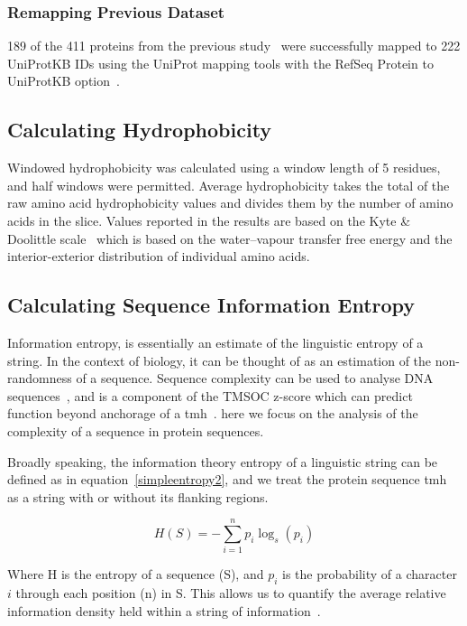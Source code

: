 \subsubsection{Remapping Previous Dataset}
189 of the 411 proteins from the previous study~\cite{Kalbfleisch2007} were successfully mapped to 222 UniProtKB IDs using the UniProt mapping tools with the RefSeq Protein to UniProtKB option~\cite{TheUniProtConsortium2014}.

\subsection{Calculating Hydrophobicity}
Windowed hydrophobicity was calculated using a window length of 5 residues, and half windows were permitted.
Average hydrophobicity takes the total of the raw amino acid hydrophobicity values and divides them by the number of amino acids in the slice.
Values reported in the results are based on the Kyte \& Doolittle scale~\cite{Kyte1982} which is based on the water\---vapour transfer free energy and the interior-exterior distribution of individual amino acids.

\subsection{Calculating Sequence Information Entropy}
Information entropy, is essentially an estimate of the linguistic entropy of a string.
In the context of biology, it can be thought of as an estimation of the non-randomness of a sequence.
Sequence complexity can be used to analyse DNA sequences~\cite{Pinho2013, Oliver1993, Troyanskaya2002}, and is a component of the TMSOC z-score which can predict function beyond anchorage of a \gls{tmh}~\cite{Wong2011, Wong2012, Baker2017}.
here we focus on the analysis of the complexity of a sequence in protein sequences.

Broadly speaking, the information theory entropy of a linguistic string can be defined as in equation~\ref{simpleentropy2}, and we treat the protein sequence \gls{tmh} as a string with or without its flanking regions.

\begin{equation} \label{simpleentropy2}
	H(S)=-{\sum_{i=1}^n {p_i\log_s(p_i)}}
\end{equation}

Where H is the entropy of a sequence (S), and $p_i$ is the probability of a character $i$ through each position (n) in S. This allows us to quantify the average relative information density held within a string of information~\cite{Shannon1948}.

